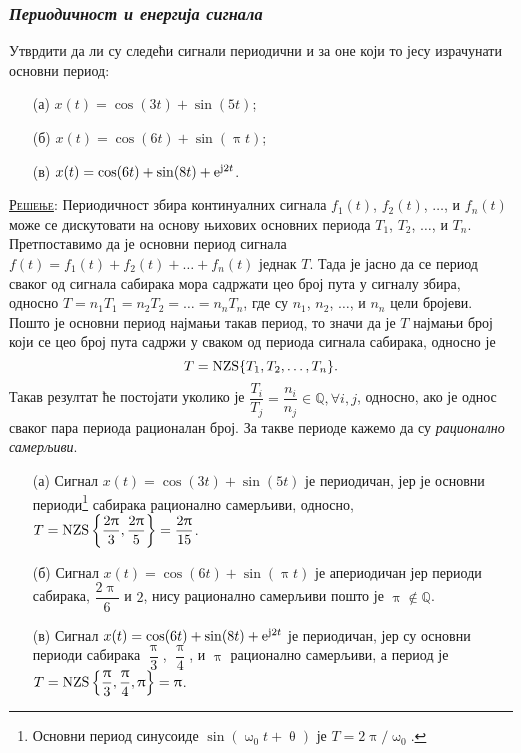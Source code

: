 \subsubsection{\textit{Периодичност и енергија сигнала}}
\PID 
\noindent 
Утврдити да ли су следећи сигнали периодични и за оне који то јесу израчунати 
основни период:
\begin{multicols}{2}
\begin{enumerate}
\item[(а)] $x(t) = \cos(3t) + \sin(5t)$;
\item[(б)] $x(t) = \cos(6t) + \sin(\uppi t)$;
\item[(в)] $x(t) = \cos(6t) + \sin(8t) + {\rm e}^{{\rm j}2t}$.
\end{enumerate}
\end{multicols}

\textsc{\underline{Решење}}:
Периодичност збира континуалних сигнала $f_1(t)$, $f_2(t)$, $\ldots$, и $f_n(t)$ може се дискутовати на основу њихових основних 
периода $T_1$, $T_2$, $\ldots$, и $T_n$. Претпоставимо да је основни период сигнала 
$f(t) = f_1(t) + f_2(t) + \ldots + f_n(t)$ једнак $T$. Тада је јасно да се период сваког од сигнала сабирака 
мора садржати цео број пута у сигналу збира, односно $T = n_1T_1 = n_2T_2 = \ldots = n_nT_n$, где су $n_1$, $n_2$, $\ldots$, и $n_n$ 
цели бројеви. Пошто је основни период најмањи такав период, то значи да је $T$ најмањи број који се цео број пута 
садржи у сваком од периода сигнала сабирака, односно је
\begin{equation}
    T = {\rm NZS} \{ T_1, T_2, \ldots, T_n\}.
    \label{eq:nzs}
\end{equation}
Такав резултат ће постојати уколико је $\dfrac{T_i}{T_j} = \dfrac{n_i}{n_j} \in \mathbb Q, \forall i,j$,
односно, ако је однос сваког пара периода рационалан број.    
За такве периоде кажемо да су \textit{рационално самерљиви}.

\begin{enumerate}
    \item[(а)] Сигнал $x(t) = \cos(3t) + \sin(5t)$ је периодичан, јер је основни периоди\footnote{
    Основни период синусоиде $\sin(\upomega_0 t + \uptheta)$ је $T = 2\uppi /\upomega_0$.
    } сабирака рационално самерљиви, односно,  
    $T = {\rm NZS} \left\{ \dfrac{2\uppi}{3}, \dfrac{2\uppi}{5} \right\} = \dfrac{2\uppi}{15}$. 
    \item[(б)] Сигнал $x(t) = \cos(6t) + \sin(\uppi t)$ је 
    апериодичан јер периоди сабирака, $\dfrac{2\uppi}{6}$ и $2$, нису рационално самерљиви пошто је 
    $\uppi \not\in \mathbb Q$.
    \item [(в)] Сигнал $x(t) = \cos(6t) + \sin(8t) + {\rm e}^{{\rm j}2t}$ је периодичан, 
    јер су основни периоди сабирака
    $\dfrac{\uppi}{3}$, $\dfrac{\uppi}{4}$, и $\uppi$ рационално самерљиви, а период
    је $T = {\rm NZS} \left\{ \dfrac{\uppi}{3}, \dfrac{\uppi}{4}, \uppi \right\} = \uppi$.
\end{enumerate}